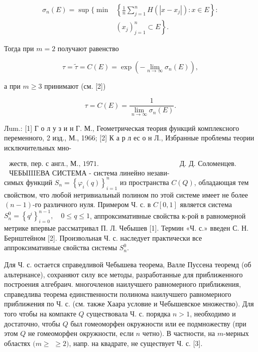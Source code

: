 \documentclass[10pt]{article}
\begin{document}
\[

\begin{aligned}

\sigma_{n}(E)=\sup \{\min & \left\{\frac{1}{n} \sum_{j=1}^{n} H\left(\left|x-x_{j}\right|\right): x \in E\right\}: \\

& \left.\left(x_{j}\right)_{j=1}^{n} \subset E\right\} .

\end{aligned}

\]



Тогда при $m=2$ получают равенство



\[

\tau=\tilde{\tau}=C(E)=\exp \left(-\lim _{n \rightarrow \infty} \sigma_{n}(E)\right),

\]



а при $m \geqslant 3$ принимают (см. [2])



\[

\tau=C(E)=\frac{1}{\lim _{n \rightarrow \infty} \sigma_{n}(E)} .

\]



Лum.: [1] Г о л у з и н Г. М., Геометрическая теория функций комплексного переменного, 2 изд., М., 1966; [2] К а р л ес о н Л., Избранные проблемы теории исключительных мно-



$\begin{array}{rr}\text { жеств, пер. с англ., М., } 1971 . & \text { Д. Д. Соломенцев. } \\ \text { ЧЕБЫIIIEВА СИСТЕМА - система линейно незави- }\end{array}$ симых функций $S_{n}=\left\{\varphi_{i}(q)\right\}_{i=1}^{n}$ из пространства $C(Q)$, обладающая тем свойством, что любой нетривиальный полином по этой системе имеет не более $(n-1)$-го различного нуля. Примером Ч. с. в $C[0,1]$ является система $S_{n}^{0}=\left\{q^{i}\right\}_{i=0}^{n-1}, \quad 0 \leqslant q \leqslant 1$, аппроксимативные свойства к-рой в равномерной метрике впервые рассматривал П. Л. Чебышев [1]. Термин «Ч. с.» введен С. Н. Бернштейном [2]. Произвольная Ч. с. наследует практически все аппроксимативные свойства системы $S_{n}^{0}$.



Для Ч. с. остается справедливой Чебышева теорема, Валле Пуссена теоремд (об альтернансе), сохраняют силу все методы, разработанные для приближенного построения алгебраич. многочленов наилучшего равномерного приближения, справедлива теорема единственности полинома наилучшего равномерного приближения по Ч. с. (см. также Хаара условие и Чебышевское множество). Для того чтобы на компакте $Q$ существовала Ч. с. порядка $n>1$, необходимо и достаточно, чтобы $Q$ был гомеоморфен окружности или ее подмножеству (при этом $Q$ не гомеоморфен окружности, если $n$ четно). В частности, на $m$-мерных областях $(m \geqslant$ $\geqslant 2)$, напр. на квадрате, не существует Ч. с. [3].
\end{document}
